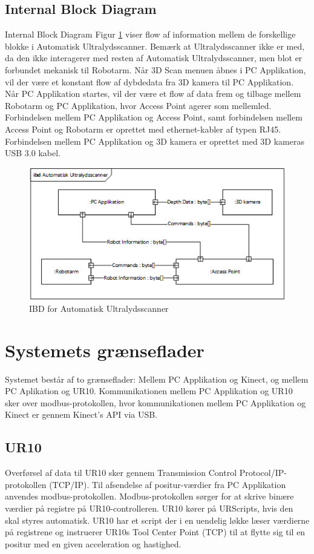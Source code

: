 \subsection{Internal Block Diagram}
Internal Block Diagram Figur \ref{IBD} viser flow af information mellem de forskellige blokke i Automatisk Ultralydsscanner.
Bemærk at Ultralydsscanner ikke er med, da den ikke interagerer med resten af Automatisk Ultralydsscanner, men blot er forbundet mekanisk til Robotarm.
Når 3D Scan menuen åbnes i PC Applikation, vil der være et konstant flow af dybdedata fra 3D kamera til PC Applikation.
Når PC Applikation startes, vil der være et flow af data frem og tilbage mellem Robotarm og PC Applikation, hvor Access Point agerer som mellemled. 
Forbindelsen mellem PC Applikation og Access Point, samt forbindelsen mellem Access Point og Robotarm er oprettet med ethernet-kabler af typen RJ45.
Forbindelsen mellem PC Applikation og 3D kamera er oprettet med 3D kameras USB 3.0 kabel. 

\begin{figure}[H]
    \centering
    \includegraphics[width=1\textwidth]{figurer/d/Design/IBD}
    \caption{IBD for Automatisk Ultralydsscanner}
    \label{IBD}
\end{figure}

\section{Systemets grænseflader}
Systemet består af to grænseflader: Mellem PC Applikation og Kinect, og mellem PC Aplikation og UR10. Kommunikationen mellem PC Applikation og UR10 sker over modbus-protokollen, hvor kommunikationen mellem PC Applikation og Kinect er gennem Kinect's API via USB.

\subsection{UR10}
Overførsel af data til UR10 sker gennem Transmission Control Protocol/IP-protokollen (TCP/IP). Til afsendelse af positur-værdier fra PC Applikation anvendes modbus-protokollen. Modbus-protokollen sørger for at skrive binære værdier på registre på UR10-controlleren. UR10 kører på URScripts, hvis den skal styres automatisk. UR10 har et script der i en uendelig løkke læser værdierne på registrene og instruerer UR10s Tool Center Point (TCP) til at flytte sig til en positur med en given acceleration og hastighed.

